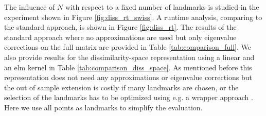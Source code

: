 \documentclass[twoside,11pt]{article}
\begin{document}
The influence of $N$ with respect to a fixed number of landmarks is studied in the experiment shown in Figure \ref{fig:diss_rt_swiss}.
A runtime analysis, comparing to the standard approach, is shown in Figure \ref{fig:diss_rt}. The results of the standard approach where no approximations are used but only eigenvalue corrections on the full matrix 
are provided in Table \ref{tab:comparison_full}. We also provide results for the dissimilarity-space representation using a linear and an elm kernel \cite{DBLP:journals/ijon/FrenayV11} in Table \ref{tab:comparison_diss_space}.
As mentioned before this representation does not need any approximations or eigenvalue corrections but the out of sample extension is
costly if many landmarks are chosen, or the selection of the landmarks has to be optimized using e.g. a wrapper approach \cite{DBLP:journals/pr/PekalskaDP06}.
Here we use all points as landmarks to simplify the evaluation.
\end{document}
